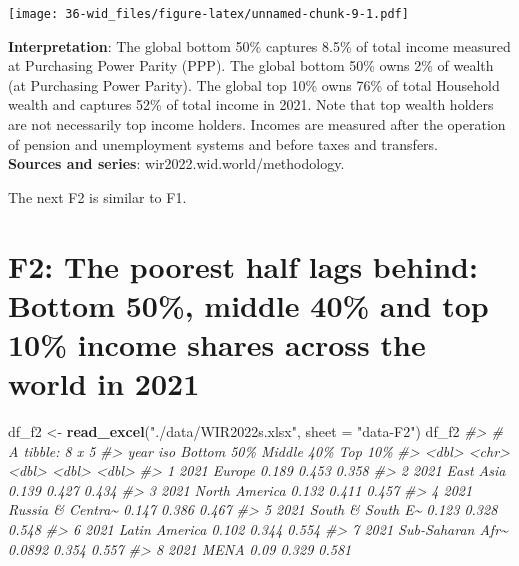 \documentclass[
  xelatex, ja=standard]{bxjsbook}
\newenvironment{Shaded}{\begin{snugshade}}{\end{snugshade}}
\newcommand{\AttributeTok}[1]{\textcolor[rgb]{0.13,0.29,0.53}{#1}}
\newcommand{\CommentTok}[1]{\textcolor[rgb]{0.56,0.35,0.01}{\textit{#1}}}
\newcommand{\FunctionTok}[1]{\textcolor[rgb]{0.13,0.29,0.53}{\textbf{#1}}}
\newcommand{\NormalTok}[1]{#1}
\newcommand{\OtherTok}[1]{\textcolor[rgb]{0.56,0.35,0.01}{#1}}
\newcommand{\StringTok}[1]{\textcolor[rgb]{0.31,0.60,0.02}{#1}}
\theoremstyle{definition}
\theoremstyle{definition}
\theoremstyle{definition}
\theoremstyle{definition}
\theoremstyle{remark}
\begin{document}
\texttt{[image: 36-wid\_files/figure-latex/unnamed-chunk-9-1.pdf]}

\textbf{Interpretation}: The global bottom 50\% captures 8.5\% of total income measured at Purchasing Power Parity (PPP). The global bottom 50\% owns 2\% of wealth (at Purchasing Power Parity). The global top 10\% owns 76\% of total Household wealth and captures 52\% of total income in 2021. Note that top wealth holders are not necessarily top income holders. Incomes are measured after the operation of pension and unemployment systems and before taxes and transfers.\\
\textbf{Sources and series}: wir2022.wid.world/methodology.

The next F2 is similar to F1.

\hypertarget{f2-the-poorest-half-lags-behind-bottom-50-middle-40-and-top-10-income-shares-across-the-world-in-2021}{%
\section{F2: The poorest half lags behind: Bottom 50\%, middle 40\% and top 10\% income shares across the world in 2021}\label{f2-the-poorest-half-lags-behind-bottom-50-middle-40-and-top-10-income-shares-across-the-world-in-2021}}

\begin{Shaded}
\begin{Highlighting}[]
\NormalTok{df\_f2 }\OtherTok{\textless{}{-}} \FunctionTok{read\_excel}\NormalTok{(}\StringTok{"./data/WIR2022s.xlsx"}\NormalTok{, }\AttributeTok{sheet =} \StringTok{"data{-}F2"}\NormalTok{)}
\NormalTok{df\_f2}
\CommentTok{\#\textgreater{} \# A tibble: 8 x 5}
\CommentTok{\#\textgreater{}    year iso              \textasciigrave{}Bottom 50\%\textasciigrave{} \textasciigrave{}Middle 40\%\textasciigrave{} \textasciigrave{}Top 10\%\textasciigrave{}}
\CommentTok{\#\textgreater{}   \textless{}dbl\textgreater{} \textless{}chr\textgreater{}                   \textless{}dbl\textgreater{}        \textless{}dbl\textgreater{}     \textless{}dbl\textgreater{}}
\CommentTok{\#\textgreater{} 1  2021 Europe                 0.189         0.453     0.358}
\CommentTok{\#\textgreater{} 2  2021 East Asia              0.139         0.427     0.434}
\CommentTok{\#\textgreater{} 3  2021 North America          0.132         0.411     0.457}
\CommentTok{\#\textgreater{} 4  2021 Russia \& Centra\textasciitilde{}       0.147         0.386     0.467}
\CommentTok{\#\textgreater{} 5  2021 South \& South E\textasciitilde{}       0.123         0.328     0.548}
\CommentTok{\#\textgreater{} 6  2021 Latin America          0.102         0.344     0.554}
\CommentTok{\#\textgreater{} 7  2021 Sub{-}Saharan Afr\textasciitilde{}       0.0892        0.354     0.557}
\CommentTok{\#\textgreater{} 8  2021 MENA                   0.09          0.329     0.581}
\end{Highlighting}
\end{Shaded}
\end{document}
